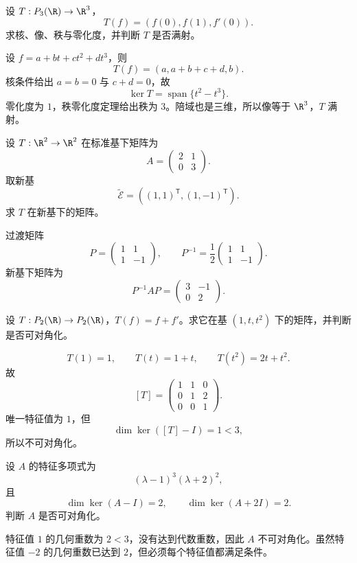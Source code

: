 \begin{exercise}[level=standard]
设 $T:P_3(\R)\to\R^3$，
\[
T(f)=(f(0),f(1),f'(0)).
\]
求核、像、秩与零化度，并判断 $T$ 是否满射。
\begin{solution}
设 $f=a+bt+ct^2+dt^3$，则
\[
T(f)=(a,a+b+c+d,b).
\]
核条件给出 $a=b=0$ 与 $c+d=0$，故
\[
\ker T=\operatorname{span}\{t^2-t^3\}.
\]
零化度为 $1$，秩零化度定理给出秩为 $3$。陪域也是三维，所以像等于 $\R^3$，$T$ 满射。
\end{solution}
\end{exercise}

\begin{exercise}[level=standard]
设 $T:\R^2\to\R^2$ 在标准基下矩阵为
\[
A=\begin{pmatrix}2&1\\0&3\end{pmatrix}.
\]
取新基
\[
\widetilde{\mathcal E}
=((1,1)^{\mathsf T},(1,-1)^{\mathsf T}).
\]
求 $T$ 在新基下的矩阵。
\begin{solution}
过渡矩阵
\[
P=\begin{pmatrix}1&1\\1&-1\end{pmatrix},
\qquad
P^{-1}=\frac12\begin{pmatrix}1&1\\1&-1\end{pmatrix}.
\]
新基下矩阵为
\[
P^{-1}AP
=\begin{pmatrix}
3&-1\\
0&2
\end{pmatrix}.
\]
\end{solution}
\end{exercise}

\begin{exercise}[level=standard]
设 $T:P_2(\R)\to P_2(\R)$，$T(f)=f+f'$。求它在基 $(1,t,t^2)$ 下的矩阵，并判断是否可对角化。
\begin{solution}
\[
T(1)=1,\qquad
T(t)=1+t,\qquad
T(t^2)=2t+t^2.
\]
故
\[
[T]=\begin{pmatrix}
1&1&0\\
0&1&2\\
0&0&1
\end{pmatrix}.
\]
唯一特征值为 $1$，但
\[
\dim\ker([T]-I)=1<3,
\]
所以不可对角化。
\end{solution}
\end{exercise}

\begin{exercise}[level=standard]
设 $A$ 的特征多项式为
\[
(\lambda-1)^3(\lambda+2)^2,
\]
且
\[
\dim\ker(A-I)=2,\qquad
\dim\ker(A+2I)=2.
\]
判断 $A$ 是否可对角化。
\begin{solution}
特征值 $1$ 的几何重数为 $2<3$，没有达到代数重数，因此 $A$ 不可对角化。虽然特征值 $-2$ 的几何重数已达到 $2$，但必须每个特征值都满足条件。
\end{solution}
\end{exercise}

